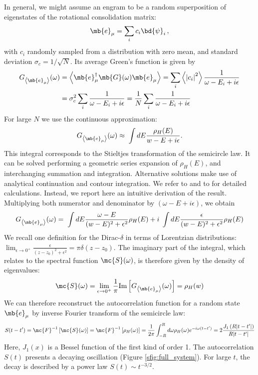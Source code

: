 In general, we might assume an engram to be a random superposition of eigenstates of the rotational consolidation matrix: $$\mb{e}_\mu = \sum_i c_i \bd{\psi}_i \,,$$ with $c_i$ randomly sampled from a distribution with zero mean, and standard deviation $\sigma_c = 1/\sqrt{N}$.
Its average Green's function is given by
\begin{align*}
    G_{\left<\mb{e}_\mu\right>} (\omega) & = \left< \mb{e}_\mu^\dagger \mb{G}(\omega) \mb{e}_\mu \right> =
    \sum_i \left< \left|c_i\right|^2 \right> \frac{1}{\omega - E_i+ i \epsilon} \\
    &
    = \sigma_c^2 \sum_i \frac{1}{\omega - E_i + i \epsilon} =
    \frac{1}{N} \sum_i \frac{1}{\omega - E_i + i \epsilon}
\end{align*}
For large $N$ we use the continuous approximation:
\begin{equation*}
    G_{\left<\mb{e}_\mu\right>} (\omega)  \approx \hspace{0.1cm} \int dE \frac{\rho_H(E)}{w-E+ i \epsilon}.
\end{equation*}
This integral corresponds to the Stieltjes transformation of the semicircle law. It can be solved performing a geometric series expansion of $\rho_H(E)$, and interchanging summation and integration. Alternative solutions make use of analytical continuation and contour integration. We refer to \cite{Jiang2021a} and to \cite{Bai2010} for detailed calculations.
Instead, we report here an intuitive derivation of the result. Multiplying both numerator and denominator by $(\omega-E+i\epsilon)$, we obtain
\begin{equation*}
    G_{\left<\mb{e}_\mu\right>} (\omega) =
    \hspace{0.1cm} \int dE \frac{\omega-E}{(w-E)^2+ \epsilon^2}\rho_H(E) +
    i \hspace{0.1cm} \int dE \frac{\epsilon}{(w-E)^2+ \epsilon^2}\rho_H(E)
\end{equation*}
We recall one definition for the Dirac-$\delta$ in terms of Lorentzian distributions:
$
\lim_{\epsilon\to0^+}\frac{\epsilon}{(z-z_0)^2 + \epsilon^2} = \pi \delta(z-z_0)
$.
The imaginary part of the integral, which relates to the spectral function $\mc{S}(\omega)$, is therefore given by the density of eigenvalues:
$$
\mc{S}(\omega)=\lim_{\epsilon\to0^+} \frac{1}{\pi} \text{Im}\left[ G_{\left<\mb{e}_\mu\right>} (\omega) \right] =
\rho_H(w)
$$
We can therefore reconstruct the autocorrelation function for a random state $\mb{e}_\mu$ by inverse Fourier transform of the semicircle law:
\begin{equation}
    S(t-t') = \mc{F}^{-1}\left[ \mc{S}(\omega) \right] = \mc{F}^{-1}\left[ \rho_H(\omega) \right] =
    \frac{1}{2 \pi}\int_{-R}^{R} d\omega \rho_H(\omega) e^{-i\omega(t-t')} = 2 \frac{J_1\left(R|t-t'|\right)}{R|t-t'|}
    \label{eq:autocorrelation_bessel}
\end{equation}
Here, $J_1(x)$ is a Bessel function of the first kind of order 1. The autocorrelation $S(t)$ presents a decaying oscillation (Figure \ref{sfig:full_system}). For large $t$, the decay is described by a power law $S(t) \sim t^{-3/2}$.

